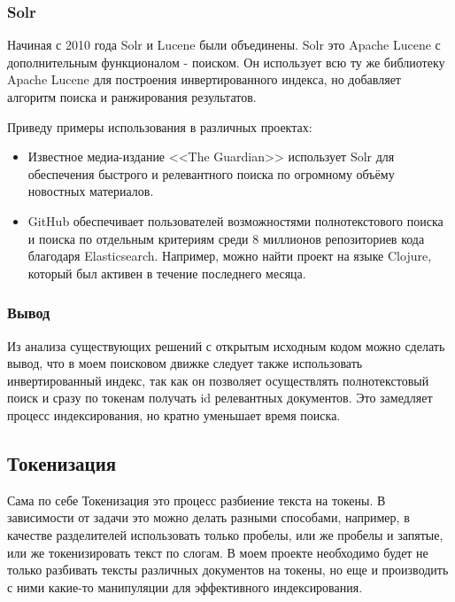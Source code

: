 \subsubsection{Solr}
Начиная с 2010 года Solr \cite{solr} и Lucene были объединены. Solr это Apache Lucene с дополнительным функционалом - поиском. 
Он использует всю ту же библиотеку Apache Lucene для построения инвертированного индекса, но добавляет алгоритм поиска 
и ранжирования результатов. 

Приведу примеры использования в различных проектах:
\begin{itemize}
    \item {Известное медиа-издание <<The Guardian>> использует Solr для обеспечения быстрого и релевантного поиска по огромному объёму новостных материалов.}
    \item {GitHub обеспечивает пользователей возможностями полнотекстового поиска и поиска по отдельным критериям среди 
    8 миллионов репозиториев кода благодаря Elasticsearch. Например, можно найти проект на языке Clojure, который 
    был активен в течение последнего месяца.}
\end{itemize}

\subsubsection{Вывод}
Из анализа существующих решений с открытым исходным кодом можно сделать вывод, что в моем поисковом движке следует 
также использовать инвертированный индекс, так как он позволяет осуществлять полнотекстовый поиск и сразу по токенам 
получать id релевантных документов. Это замедляет процесс индексирования, но кратно уменьшает время поиска.


\subsection{Токенизация}
Сама по себе Токенизация это процесс разбиение текста на токены. В зависимости от задачи это можно делать разными 
способами, например, в качестве разделителей использовать только пробелы, или же пробелы и запятые, или же 
токенизировать текст по слогам. В моем проекте необходимо будет не только разбивать тексты различных документов на 
токены, но еще и производить с ними какие-то манипуляции для эффективного индексирования. 

